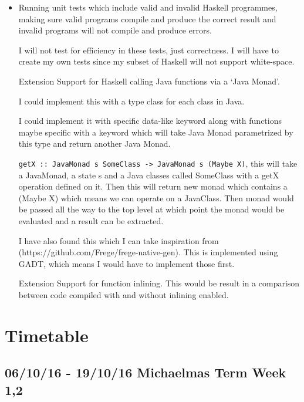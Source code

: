\documentclass[a4paper,12pt]{article}
\begin{document}
  \begin{itemize}
    \item
      Running unit tests which include valid and invalid Haskell programmes, making sure valid programs compile and produce the correct result and invalid
      programs will not compile and produce errors.

      I will not test for efficiency in these tests, just correctness. I will have to create my own tests since my subset of Haskell will not support white-space.

    \item
      [Extension] Support for Haskell calling Java functions via a `Java Monad'.
      
      I could implement this with a type class for each class in Java.
      
      I could implement it with specific data-like keyword along with functions
      maybe specific with a keyword which will take Java Monad parametrized by this type and return another Java Monad.

      \texttt{getX :: JavaMonad s SomeClass -> JavaMonad s (Maybe X)}, this will take a JavaMonad, a state s and a Java classes called SomeClass with a
      getX operation defined on it. Then this will return new monad which contains a (Maybe X) which means we can operate on a JavaClass. Then monad
      would be passed all the way to the top level at which point the monad would be evaluated and a result can be extracted.

      I have also found this which I can take inspiration from (https://github.com/Frege/frege-native-gen). This is implemented using GADT, which means
      I would have to implement those first.

    \item [Extension] Support for function inlining. This would be result in a comparison between code compiled with and without inlining enabled.
      

  \end{itemize}

  \section*{Timetable}

    \subsection*{06/10/16 - 19/10/16  \hfill Michaelmas Term Week 1,2}
\end{document}
